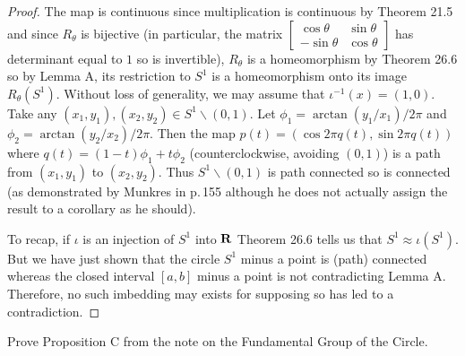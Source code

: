 \begin{proof}
The map is continuous since multiplication is continuous by Theorem
21.5 and since $R_\theta$ is bijective (in particular, the matrix
$\left[\begin{smallmatrix}\cos\theta&\sin\theta\\-\sin\theta&\cos\theta\end{smallmatrix}\right]$
has determinant equal to $1$ so is invertible), $R_\theta$ is a
homeomorphism by Theorem 26.6 so by Lemma A, its restriction to $S^1$ is a
homeomorphism onto its image $R_\theta(S^1)$. Without loss of generality,
we may assume that $\iota^{-1}(x)=(1,0)$. Take any $(x_1,y_1),(x_2,y_2)\in
S^1\smallsetminus(0,1)$. Let $\phi_1=\arctan(y_1/x_1)/2\pi$ and
$\phi_2=\arctan(y_2/x_2)/2\pi$. Then the map $p(t)=(\cos 2\pi q(t),\sin
2\pi q(t))$ where $q(t)=(1-t)\phi_1+t\phi_2$ (counterclockwise, avoiding
$(0,1)$) is a path from $(x_1,y_1)$ to $(x_2,y_2)$. Thus $S^1\smallsetminus
(0,1)$ is path connected so is connected (as demonstrated by Munkres in
p.\,155 although he does not actually assign the result to a corollary as
he should).

To recap, if $\iota$ is an injection of $S^1$ into $\mathbf{R}$ Theorem 26.6 tells
us that $S^1\approx\iota(S^1)$. But we have just shown that the circle
$S^1$ minus a point is (path) connected whereas the closed interval $[a,b]$
minus a point is not contradicting Lemma A. Therefore, no such imbedding
may exists for supposing so has led to a contradiction.
\end{proof}
\newpage
\begin{problem}[(D)]
Prove Proposition C from the note on the Fundamental Group of the Circle.
\end{problem}
